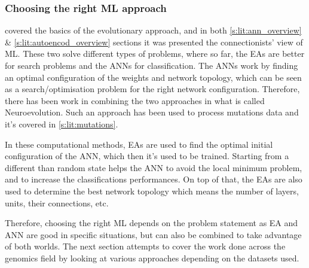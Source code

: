 \subsubsection{Choosing the right ML approach} \label{s:lit:neuroevolution}

 covered the basics of the evolutionary approach, and in both \ref{s:lit:ann_overview} \& \ref{s:lit:autoencod_overview} sections it was presented the connectionists' view of ML. These two solve different types of problems, where so far, the EAs are better for search problems and the ANNs for classification. The ANNs work by finding an optimal configuration of the weights and network topology, which can be seen as a search/optimisation problem for the right network configuration. Therefore, there has been work in combining the two approaches in what is called Neuroevolution. Such an approach has been used to process mutations data and it's covered in \cref{s:lit:mutations}.

In these computational methods, EAs are used to find the optimal initial configuration of the ANN, which then it's used to be trained. Starting from a different than random state helps the ANN to avoid the local minimum problem, and to increase the classifications performances. On top of that, the EAs are also used to determine the best network topology which means the number of layers, units, their connections, etc.

Therefore, choosing the right ML depends on the problem statement as EA and ANN are good in specific situations, but can also be combined to take advantage of both worlds. The next section attempts to cover the work done across the genomics field by looking at various approaches depending on the datasets used.






